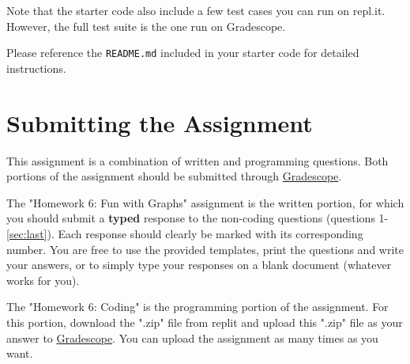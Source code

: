 \documentclass [12pt]{article}
\begin{document}
Note that the starter code also include a few test cases you can run on repl.it. However, the full test suite is the one run on Gradescope.

Please reference the \texttt{README.md} included in your starter code for detailed instructions.

\section*{Submitting the Assignment}

This assignment is a combination of written and programming questions. Both portions of the assignment should be submitted through \href{https://www.gradescope.com/courses/350304}{Gradescope}.

The "Homework 6: Fun with Graphs" assignment is the written portion, for which you should submit a \textbf{typed} response to the non-coding questions (questions 1-\ref{sec:last}). Each response should clearly be marked with its corresponding number. You are free to use the provided templates, print the questions and write your answers, or to simply type your responses on a blank document (whatever works for you).

The "Homework 6: Coding" is the programming portion of the assignment. For this portion, download the ".zip" file from replit and upload this ".zip" file as your answer to \href{https://www.gradescope.com/courses/350304}{Gradescope}. You can upload the assignment as many times as you want.
\end{document}
